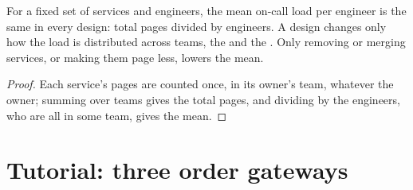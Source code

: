 \label{lst:fm:engineering-organisation-design:measures}

\begin{proposition}\label{prop:fm:engineering-organisation-design:load}
For a fixed set of services and engineers, the mean on-call load per engineer is the same in every design: total pages divided by engineers. A
design changes only how the load is distributed across teams, the  and the . Only removing or merging services, or
making them page less, lowers the mean.
\end{proposition}

\begin{proof}
Each service's pages are counted once, in its owner's team, whatever the owner; summing over teams gives the total pages, and dividing by the
engineers, who are all in some team, gives the mean.
\end{proof}

\section{Tutorial: three order gateways}\label{tut:fm:engineering-organisation-design:tut}

